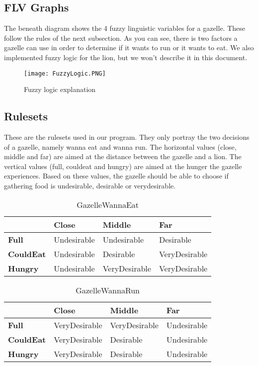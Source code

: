 \subsection{FLV Graphs}\label{subsec:flvGraphs}
The beneath diagram shows the 4 fuzzy linguistic variables for a gazelle.
These follow the rules of the next subsection.
As you can see, there is two factors a gazelle can use in order to determine if it wants to run or it wants to eat.
We also implemented fuzzy logic for the lion, but we won't describe it in this document.
\begin{figure}[ht]
    \begin{center}
        \texttt{[image: FuzzyLogic.PNG]}
    \end{center}
    \caption{Fuzzy logic explanation}
    \label{fig:FuzzyLogicExplanation}
\end{figure}
\subsection{Rulesets}
These are the rulesets used in our program.
They only portray the two decisions of a gazelle, namely wanna eat and wanna run.
The horizontal values (close, middle and far) are aimed at the distance between the gazelle and a lion.
The vertical values (full, couldeat and hungry) are aimed at the hunger the gazelle experiences.
Based on these values, the gazelle should be able to choose if gathering food is undesirable, desirable or verydesirable.
\begin{table}[ht]
    \centering
    \label{EatDesirability}
    \begin{tabular}{|l|l|l|l|}
        \hline
        & \textbf{Close}       & \textbf{Middle}        & \textbf{Far}           \\ \hline
        \textbf{Full}     & Undesirable & Undesirable   & Desirable     \\ \hline
        \textbf{CouldEat} & Undesirable & Desirable     & VeryDesirable \\ \hline
        \textbf{Hungry}   & Undesirable & VeryDesirable & VeryDesirable \\ \hline
    \end{tabular}
    \caption{GazelleWannaEat}
\end{table}
\begin{table}[ht]
    \centering
    \label{|RunDesirability}
    \begin{tabular}{|l|l|l|l|}
        \hline
        & \textbf{Close}       & \textbf{Middle}        & \textbf{Far}           \\ \hline
        \textbf{Full}     & VeryDesirable & VeryDesirable   & Undesirable     \\ \hline
        \textbf{CouldEat} & VeryDesirable & Desirable     & Undesirable \\ \hline
        \textbf{Hungry}   & VeryDesirable & Desirable & Undesirable \\ \hline
    \end{tabular}
    \caption{GazelleWannaRun}
\end{table}
